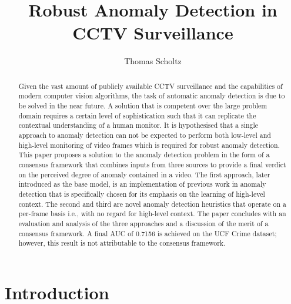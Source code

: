 \documentclass[sigplan,authorversion,nonacm, 9pt]{acmart}
\begin{document}
\title{Robust Anomaly Detection in CCTV Surveillance}

\author{Thomas Scholtz}

\begin{abstract}
Given the vast amount of publicly available CCTV surveillance and the capabilities of modern computer vision algorithms, the task of automatic anomaly detection is due to be solved in the near future. A solution that is competent over the large problem domain requires a certain level of sophistication such that it can replicate the contextual understanding of a human monitor. It is hypothesised that a single approach to anomaly detection can not be expected to perform both low-level and high-level monitoring of video frames which is required for robust anomaly detection. 
This paper proposes a solution to the anomaly detection problem in the form of a consensus framework that combines inputs from three sources to provide a final verdict on the perceived degree of anomaly contained in a video. The first approach, later introduced as the base model, is an implementation of previous work in anomaly detection that is specifically chosen for its emphasis on the learning of high-level context. The second and third are novel anomaly detection heuristics that operate on a per-frame basis i.e., with no regard for high-level context. The paper concludes with an evaluation and analysis of the three approaches and a discussion of the merit of a consensus framework. A final AUC of 0.7156 is achieved on the UCF Crime dataset; however, this result is not attributable to the consensus framework.
\end{abstract}



\maketitle

\section{Introduction}
\par
\end{document}
